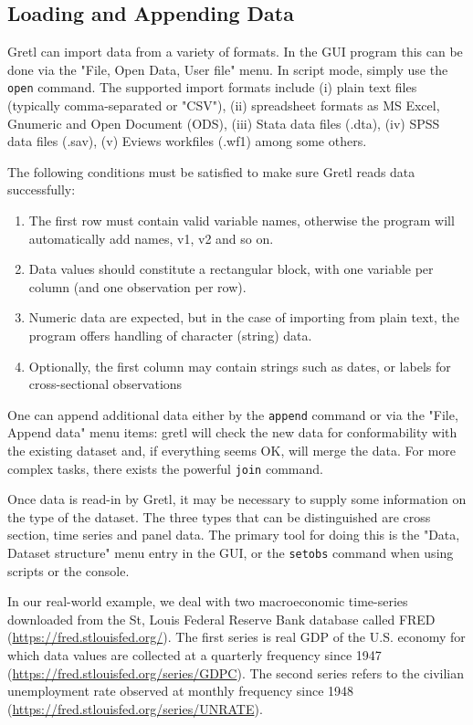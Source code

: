 \documentclass[11pt]{article}
\begin{document}
\subsection{Loading and Appending Data}
\label{sec:dataloadappend}
Gretl can import data from a variety of formats. In the GUI program this can be done via the "File, Open Data, User file" menu. In script mode, simply use the \texttt{open} command. The supported import formats include (i) plain text files (typically comma-separated or "CSV"), (ii) spreadsheet formats as MS Excel, Gnumeric and Open Document (ODS), (iii) Stata data files (.dta), (iv) SPSS data files (.sav), (v) Eviews workfiles (.wf1) among some others.

The following conditions must be satisfied to make sure Gretl reads data successfully:
\begin{enumerate}
	\item The first row must contain valid variable names, otherwise the program will automatically add names, v1, v2 and so on.
	\item Data values should constitute a rectangular block, with one variable per column (and one observation per row).
	\item Numeric data are expected, but in	the case of importing from plain text, the program offers handling of character (string) data.
	\item Optionally, the first column may contain strings such as	dates, or labels for cross-sectional observations
\end{enumerate}

One can append additional data either by the \texttt{append} command or via the "File, Append data" menu items: gretl will check the
new data for conformability with the existing dataset and, if everything seems OK, will merge the data. For more complex tasks, there exists the powerful \texttt{join} command.

Once data is read-in by Gretl, it may be necessary to supply some information on the type of the dataset. The three types that can be distinguished are cross section, time series and panel data. The primary tool for doing this is the "Data, Dataset structure" menu entry in the GUI, or the \texttt{setobs} command when using scripts or the console.

In our real-world example, we deal with two macroeconomic time-series downloaded from the St, Louis Federal Reserve Bank database called FRED (\url{https://fred.stlouisfed.org/}). The first series is real GDP of the U.S. economy for which data values are collected at a quarterly frequency since 1947 (\url{https://fred.stlouisfed.org/series/GDPC}). The second series refers to the civilian unemployment rate observed at monthly frequency since 1948 (\url{https://fred.stlouisfed.org/series/UNRATE}).
\end{document}
